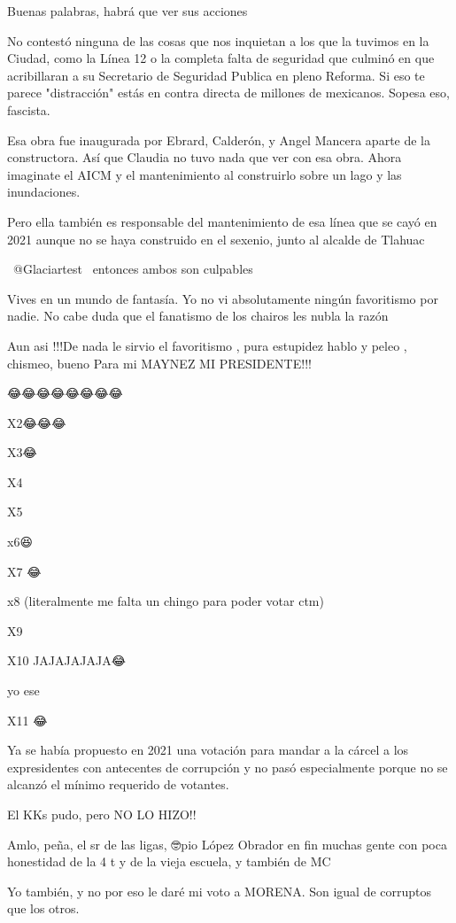 Buenas palabras, habrá que ver sus acciones

No contestó ninguna de las cosas que nos inquietan a los que la tuvimos en la Ciudad, como la Línea 12 o la completa falta de seguridad que culminó en que acribillaran a su Secretario de Seguridad Publica en pleno Reforma. 
Si eso te parece "distracción" estás en contra directa de millones de mexicanos. Sopesa eso, fascista.

Esa obra fue inaugurada por Ebrard, Calderón, y Angel Mancera aparte de la constructora. Así que Claudia no tuvo nada que ver con esa obra. Ahora imaginate el AICM y el mantenimiento al construirlo sobre un lago y las inundaciones.

Pero ella también es responsable del mantenimiento de esa línea que se cayó en 2021 aunque no se haya construido en el sexenio, junto al alcalde de Tlahuac

 @Glaciartest  entonces ambos son culpables

Vives en un mundo de fantasía. Yo no vi absolutamente ningún favoritismo por nadie. No cabe duda que el fanatismo de los chairos les nubla la razón

Aun asi !!!De nada le sirvio el favoritismo , pura estupidez hablo y peleo , chismeo, bueno Para mi MAYNEZ MI PRESIDENTE!!!

😂😂😂😂😂😂😂😂

X2😂😂😂

X3😂

X4

X5👀😂😂😂

x6😆

X7 😂

x8 (literalmente me falta un chingo para poder votar ctm)

X9

X10 JAJAJAJAJA😂

yo ese

X11 😂

Ya se había propuesto en 2021 una votación para mandar a la cárcel a los expresidentes con antecentes de corrupción y no pasó especialmente porque no se alcanzó el mínimo requerido de votantes.

El KKs pudo, pero NO LO HIZO!!

Amlo, peña, el sr de las ligas, 🤓pio López Obrador en fin muchas gente con poca honestidad de la 4 t y de la vieja escuela, y también de MC

Yo también, y no por eso le daré mi voto a MORENA. Son igual de corruptos que los otros.

